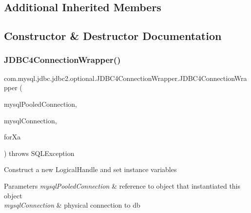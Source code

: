 \subsection*{Additional Inherited Members}


\subsection{Constructor \& Destructor Documentation}
\mbox{\label{classcom_1_1mysql_1_1jdbc_1_1jdbc2_1_1optional_1_1_j_d_b_c4_connection_wrapper_a505ead6cf4c8609d2a8629cb52f2ce44}} 
\subsubsection{\texorpdfstring{J\+D\+B\+C4\+Connection\+Wrapper()}{JDBC4ConnectionWrapper()}}
{\footnotesize\ttfamily com.\+mysql.\+jdbc.\+jdbc2.\+optional.\+J\+D\+B\+C4\+Connection\+Wrapper.\+J\+D\+B\+C4\+Connection\+Wrapper (\begin{DoxyParamCaption}\item[{\mbox{\hyperlink{classcom_1_1mysql_1_1jdbc_1_1jdbc2_1_1optional_1_1_mysql_pooled_connection}{Mysql\+Pooled\+Connection}}}]{mysql\+Pooled\+Connection,  }\item[{\mbox{\hyperlink{interfacecom_1_1mysql_1_1jdbc_1_1_connection}{com.\+mysql.\+jdbc.\+Connection}}}]{mysql\+Connection,  }\item[{boolean}]{for\+Xa }\end{DoxyParamCaption}) throws S\+Q\+L\+Exception}

Construct a new Logical\+Handle and set instance variables


\begin{DoxyParams}{Parameters}
{\em mysql\+Pooled\+Connection} & reference to object that instantiated this object \\
\hline
{\em mysql\+Connection} & physical connection to db\\
\hline
\end{DoxyParams}

